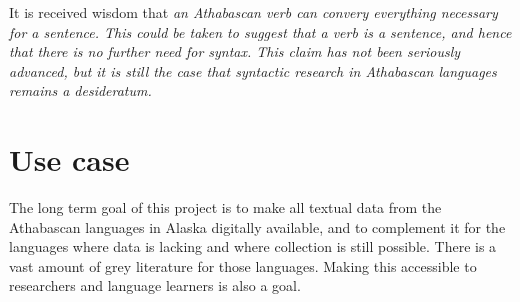 \documentclass[10pt, a4paper]{article}
\begin{document}
It is received wisdom that \em an Athabascan verb can convery everything necessary for a sentence\em. This could be taken to suggest that \em a verb is a sentence\em, and hence that there is no further need for syntax. This claim has not been seriously advanced, but it is still the case that syntactic research in Athabascan languages remains a desideratum.


% 
% 

\section{Use case}
The long term goal of this project is to make all textual data from the Athabascan languages in Ala\-ska digitally available, and to complement it for the languages where data is lacking and where collection is still possible. 
There is a vast amount of grey literature for those languages. Making this accessible to researchers and language learners is also a goal.
\end{document}
